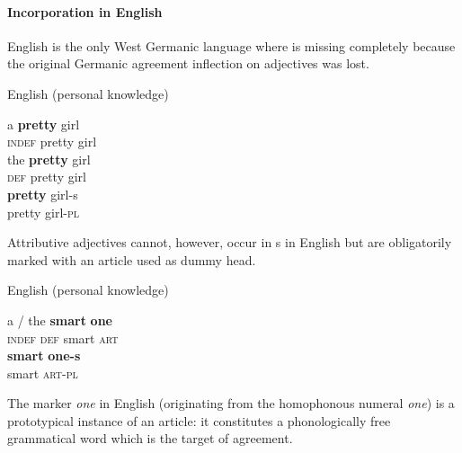 \paragraph*{Incorporation in English}
English is the only West Germanic language where  is missing completely because the original Germanic agreement inflection on adjectives was lost. 
\begin{exe}
\ex \rm{English (personal knowledge)}
\begin{xlist}
\ex 
\gll	a \textbf{pretty} girl\\
	\textsc{indef} pretty girl\\
\ex
\gll	the \textbf{pretty} girl\\
	\textsc{def} pretty girl\\
\ex 
\gll	\textbf{pretty} girl-s\\
	pretty girl-\textsc{pl}\\
\end{xlist}
\end{exe}
Attributive adjectives cannot, however, occur in s in English but are obligatorily marked with an article used as dummy head.
\begin{exe}
\ex \rm{English (personal knowledge)}
\begin{xlist}
\ex
\gll	a / the \textbf{smart} \textbf{one}\\
	\textsc{indef} {} \textsc{def} smart \textsc{art}\\
\ex	
\gll	\textbf{smart} \textbf{one-s}\\
	smart \textsc{art}-\textsc{pl}\\
\end{xlist}
\end{exe}
The marker \textit{one} in English (originating from the homophonous numeral \textit{one}) is a prototypical instance of an article: it constitutes a phonologically free grammatical word which is the target of agreement. 

